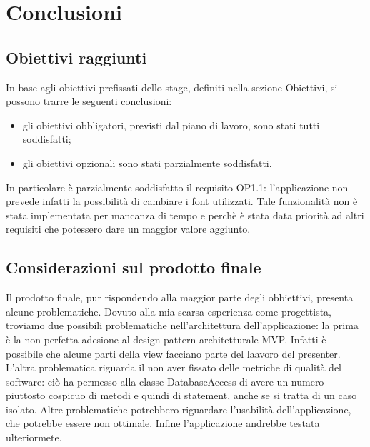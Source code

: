 \documentclass[../Tesi.tex]{subfiles}
\begin{document}
\section{Conclusioni}
	\subsection{Obiettivi raggiunti}
	In base agli obiettivi prefissati dello stage, definiti nella sezione Obiettivi, si possono trarre le seguenti conclusioni:
	\begin{itemize}
		\item gli obiettivi obbligatori, previsti dal piano di lavoro, sono stati tutti soddisfatti;
		\item gli obiettivi opzionali sono stati parzialmente soddisfatti.
	\end{itemize}
	In particolare è parzialmente soddisfatto il requisito OP1.1: l'applicazione non prevede infatti la possibilità di cambiare i font utilizzati. Tale funzionalità non è stata implementata per mancanza di tempo e perchè è stata data priorità ad altri requisiti che potessero dare un maggior valore aggiunto.

	\subsection{Considerazioni sul prodotto finale}
	Il prodotto finale, pur rispondendo alla maggior parte degli obbiettivi, presenta alcune problematiche. Dovuto alla mia scarsa esperienza come progettista, troviamo due possibili problematiche nell'architettura dell'applicazione: la prima è la non perfetta adesione al design pattern architetturale MVP. Infatti è possibile che alcune parti della view facciano parte del laavoro del presenter. L'altra problematica riguarda il non aver fissato delle metriche di qualità del software: ciò ha permesso alla classe DatabaseAccess di avere un numero piuttosto cospicuo di metodi e quindi di statement, anche se si tratta di un caso isolato. Altre problematiche potrebbero riguardare l'usabilità dell'applicazione, che potrebbe essere non ottimale. Infine l'applicazione andrebbe testata ulteriormete.
\end{document}
